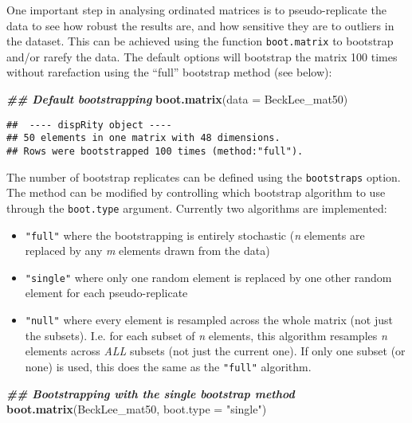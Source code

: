 \documentclass[
]{book}
\newenvironment{Shaded}{\begin{snugshade}}{\end{snugshade}}
\newcommand{\AttributeTok}[1]{\textcolor[rgb]{0.13,0.29,0.53}{#1}}
\newcommand{\DocumentationTok}[1]{\textcolor[rgb]{0.56,0.35,0.01}{\textbf{\textit{#1}}}}
\newcommand{\FunctionTok}[1]{\textcolor[rgb]{0.13,0.29,0.53}{\textbf{#1}}}
\newcommand{\NormalTok}[1]{#1}
\newcommand{\StringTok}[1]{\textcolor[rgb]{0.31,0.60,0.02}{#1}}
\providecommand{\tightlist}{%
  \setlength{\itemsep}{0pt}\setlength{\parskip}{0pt}}
\begin{document}
One important step in analysing ordinated matrices is to pseudo-replicate the data to see how robust the results are, and how sensitive they are to outliers in the dataset.
This can be achieved using the function \texttt{boot.matrix} to bootstrap and/or rarefy the data.
The default options will bootstrap the matrix 100 times without rarefaction using the ``full'' bootstrap method (see below):

\begin{Shaded}
\begin{Highlighting}[]
\DocumentationTok{\#\# Default bootstrapping}
\FunctionTok{boot.matrix}\NormalTok{(}\AttributeTok{data =}\NormalTok{ BeckLee\_mat50)}
\end{Highlighting}
\end{Shaded}

\begin{verbatim}
##  ---- dispRity object ---- 
## 50 elements in one matrix with 48 dimensions.
## Rows were bootstrapped 100 times (method:"full").
\end{verbatim}

The number of bootstrap replicates can be defined using the \texttt{bootstraps} option.
The method can be modified by controlling which bootstrap algorithm to use through the \texttt{boot.type} argument.
Currently two algorithms are implemented:

\begin{itemize}
\tightlist
\item
  \texttt{"full"} where the bootstrapping is entirely stochastic (\emph{n} elements are replaced by any \emph{m} elements drawn from the data)
\item
  \texttt{"single"} where only one random element is replaced by one other random element for each pseudo-replicate
\item
  \texttt{"null"} where every element is resampled across the whole matrix (not just the subsets). I.e. for each subset of \emph{n} elements, this algorithm resamples \emph{n} elements across \emph{ALL} subsets (not just the current one). If only one subset (or none) is used, this does the same as the \texttt{"full"} algorithm.
\end{itemize}

\begin{Shaded}
\begin{Highlighting}[]
\DocumentationTok{\#\# Bootstrapping with the single bootstrap method}
\FunctionTok{boot.matrix}\NormalTok{(BeckLee\_mat50, }\AttributeTok{boot.type =} \StringTok{"single"}\NormalTok{)}
\end{Highlighting}
\end{Shaded}
\end{document}
